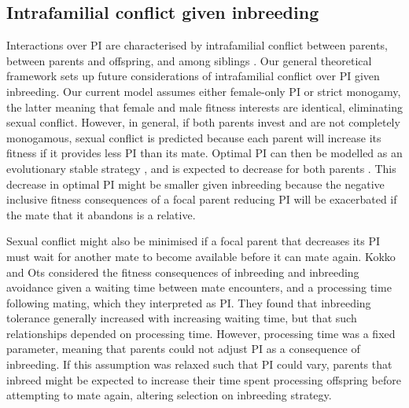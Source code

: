 \documentclass[12pt]{article}
\begin{document}
\subsection*{Intrafamilial conflict given inbreeding}

Interactions over PI are characterised by intrafamilial conflict between parents, between parents and offspring, and among siblings \cite[][]{Parker2002}. Our general theoretical framework sets up future considerations of intrafamilial conflict over PI given inbreeding. Our current model assumes either female-only PI or strict monogamy, the latter meaning that female and male fitness interests are identical, eliminating sexual conflict. However, in general, if both parents invest and are not completely monogamous, sexual conflict is predicted because each parent will increase its fitness if it provides less PI than its mate. Optimal PI can then be modelled as an evolutionary stable strategy \cite[][]{Smith1977}, and is expected to decrease for both parents \cite[][]{Parker1985}. This decrease in optimal PI might be smaller given inbreeding because the negative inclusive fitness consequences of a focal parent reducing PI will be exacerbated if the mate that it abandons is a relative. 

Sexual conflict might also be minimised if a focal parent that decreases its PI must wait for another mate to become available before it can mate again. Kokko and Ots \cite{Kokko2006} considered the fitness consequences of inbreeding and inbreeding avoidance given a waiting time between mate encounters, and a processing time following mating, which they interpreted as PI. They found that inbreeding tolerance generally increased with increasing waiting time, but that such relationships depended on processing time. However, processing time was a fixed parameter, meaning that parents could not adjust PI as a consequence of inbreeding. If this assumption was relaxed such that PI could vary, parents that inbreed might be expected to increase their time spent processing offspring before attempting to mate again, altering selection on inbreeding strategy.
\end{document}

